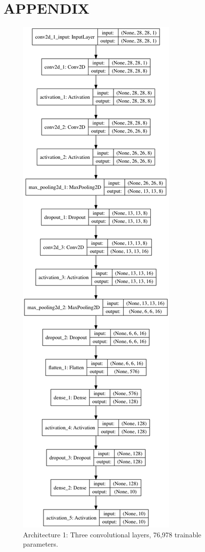 \documentclass[letterpaper, 10 pt, conference]{ieeeconf}  %
\begin{document}
\section{APPENDIX}
\begin{figure}[H]
      \centering
      \includegraphics[scale = .35]{model0.png}
		\centering
      \caption{Architecture 1: Three convolutional layers, 76,978 trainable parameters.}
      \label{figurelabel}
   \end{figure}
   
\end{document}
